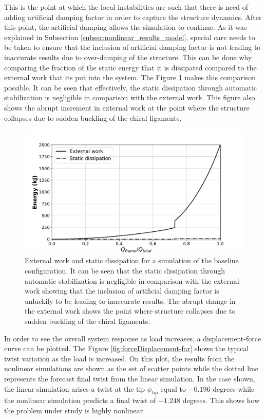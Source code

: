   This is the point at which the local instabilities are such that there is need of adding artificial damping factor in order to capture the structure dynamics. After this point, the artificial damping allows the simulation to continue. As it was explained in Subsection \ref{subsec:nonlinear_results_model}, special care needs to be taken to ensure that the inclusion of artificial damping factor is not leading to inaccurate results due to over-damping of the structure. This can be done why comparing the fraction of the static energy that it is dissipated compared to the external work that its put into the system. The Figure \ref{fig:energy} makes this comparison possible. It can be seen that effectively, the static dissipation through automatic stabilization is negligible in comparison with the external work. This figure also shows the abrupt increment in external work at the point where the structure collapses due to sudden buckling of the chiral ligaments.

  \begin{figure}[!htpb] %
    \centering
    \includegraphics[width=0.8 \textwidth]{../figures/result-sim/energy}
    \caption[External work and static dissipation for a simulation of the baseline configuration]{External work and static dissipation for a simulation of the baseline configuration. It can be seen that the static dissipation through automatic stabilization is negligible in comparison with the external work showing that the inclusion of artificial damping factor is unluckily to be leading to inaccurate results. The abrupt change in the external work shows the point where structure collapses due to sudden buckling of the chiral ligaments.}\label{fig:energy}
  \end{figure}

  In order to see the overall system response as load increases, a displacement-force curve can be plotted. The Figure \ref{fig:forceDisplacement-far} shows the typical twist variation as the load is increased. On this plot, the results from the nonlinear simulations are shown as the set of scatter points while the dotted line represents the forecast final twist from the linear simulation. In the case shown, the linear simulation arises a twist at the tip $\phi_{\mathrm{tip}}$ equal to $-0.196$ degrees while the nonlinear simulation predicts a final twist of $-1.248$ degrees. This shows how the problem under study is highly nonlinear.

